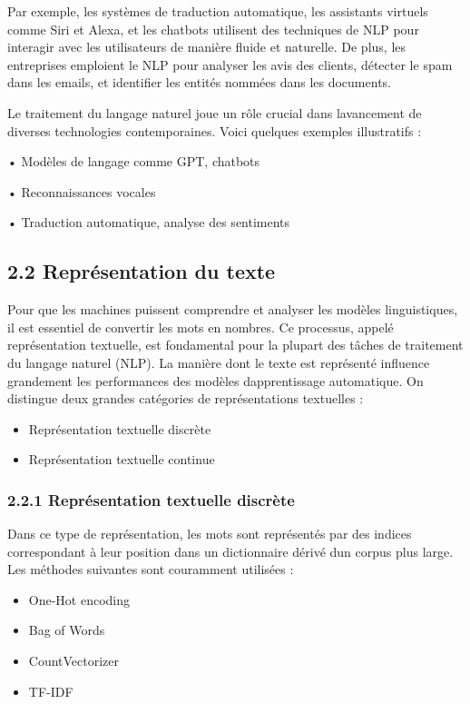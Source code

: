 \documentclass[
]{article}
\begin{document}
Par exemple, les systèmes de traduction automatique, les assistants
virtuels comme Siri et Alexa, et les chatbots utilisent des techniques
de NLP pour interagir avec les utilisateurs de manière fluide et
naturelle. De plus, les entreprises emploient le NLP pour analyser les
avis des clients, détecter le spam dans les emails, et identifier les
entités nommées dans les documents.

Le traitement du langage naturel joue un rôle crucial dans
l\textquotesingle avancement de diverses technologies contemporaines.
Voici quelques exemples illustratifs :

• Modèles de langage comme GPT, chatbots

• Reconnaissances vocales

• Traduction automatique, analyse des sentiments

\subsection{2.2 Représentation du
texte}\label{repruxe9sentation-du-texte}

\label{_Toc167600292}{}Pour que les machines puissent
comprendre et analyser les modèles linguistiques, il est essentiel de
convertir les mots en nombres. Ce processus, appelé représentation
textuelle, est fondamental pour la plupart des tâches de traitement du
langage naturel (NLP). La manière dont le texte est représenté influence
grandement les performances des modèles d\textquotesingle apprentissage
automatique. On distingue deux grandes catégories de représentations
textuelles :

\begin{itemize}
\item
  Représentation textuelle discrète
\item
  Représentation textuelle continue
\end{itemize}

\subsubsection{2.2.1 Représentation textuelle
discrète}\label{repruxe9sentation-textuelle-discruxe8te}

Dans ce type de représentation, les mots sont représentés par des
indices correspondant à leur position dans un dictionnaire dérivé
d\textquotesingle un corpus plus large. Les méthodes suivantes sont
couramment utilisées :

\begin{itemize}
\item
  One-Hot encoding
\item
  Bag of Words
\item
  CountVectorizer
\item
  TF-IDF
\end{itemize}
\end{document}
